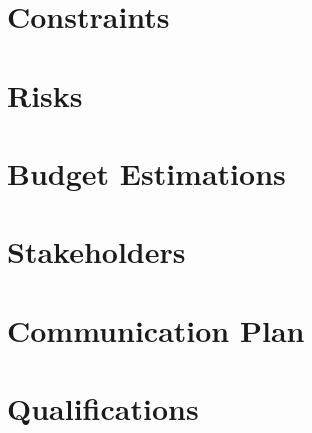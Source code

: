 \documentclass{article}
\begin{document}
	\section{Constraints}
		
		
	\section{Risks}
		
		
	\section{Budget Estimations}
		
		
	\section{Stakeholders}
		
		
	\section{Communication Plan}
		
		
	\section{Qualifications}
		
\end{document}
